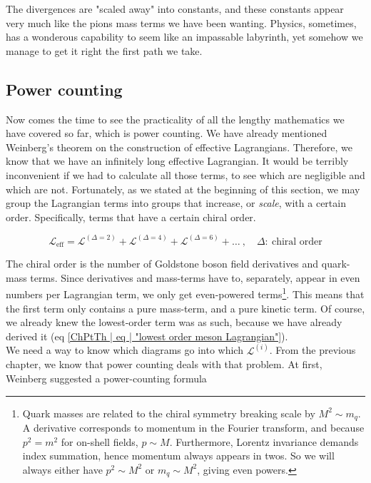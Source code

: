 \documentclass[10pt,twoside]{report}
\begin{document}
	The divergences are "scaled away" into constants, and these constants appear very much like the pions mass terms we have been wanting. Physics, sometimes, has a wonderous capability to seem like an impassable labyrinth, yet somehow we manage to get it right the first path we take.
	
	\subsection{Power counting}
	Now comes the time to see the practicality of all the lengthy mathematics we have covered so far, which is power counting. We have already mentioned Weinberg's theorem on the construction of effective Lagrangians. Therefore, we know that we have an infinitely long effective Lagrangian. It would be terribly inconvenient if we had to calculate all those terms, to see which are negligible and which are not. Fortunately, as we stated at the beginning of this section, we may group the Lagrangian terms into groups that increase, or \emph{scale}, with a certain order. Specifically, terms that have a certain chiral order.
	
	\begin{equation}
		\mathcal{L}_{\text{eff}} = \mathcal{L}^{(\Delta=2)} + \mathcal{L}^{(\Delta=4)} + \mathcal{L}^{(\Delta=6)} + \ldots\:,\quad \Delta:\:\text{chiral order}
	\end{equation}
	
	The chiral order is the number of Goldstone boson field derivatives and quark-mass terms. Since derivatives and mass-terms have to, separately, appear in even numbers per Lagrangian term, we only get even-powered terms\footnote{Quark masses are related to the chiral symmetry breaking scale by $M^2 \sim m_q$. A derivative corresponds to momentum in the Fourier transform, and because $p^2=m^2$ for on-shell fields, $p\sim M$. Furthermore, Lorentz invariance demands index summation, hence momentum always appears in twos. So we will always either have $p^2\sim M^2$ or $m_q\sim M^2$, giving even powers.}. This means that the first term only contains a pure mass-term, and a pure kinetic term. Of course, we already knew the lowest-order term was as such, because we have already derived it (eq \ref{ChPtTh | eq | "lowest order meson Lagrangian"}).\\
	
	We need a way to know which diagrams go into which $\mathcal{L}^{(i)}$. From the previous chapter, we know that power counting deals with that problem. At first, Weinberg suggested a power-counting formula
	
\end{document}
